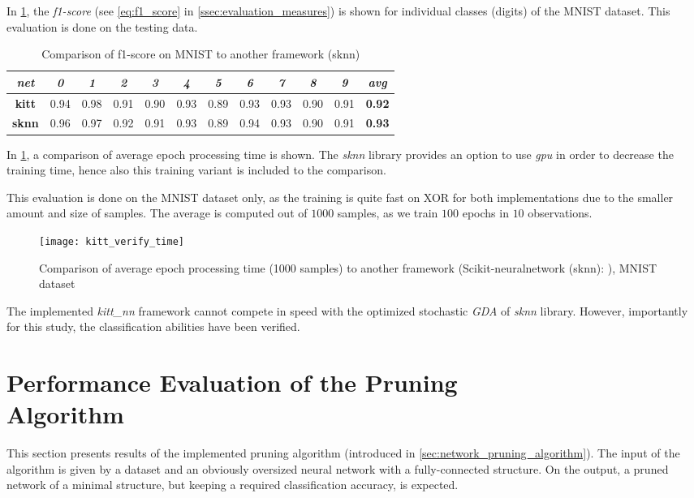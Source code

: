 In \cref{tab:kitt_verify_f1}, the \textit{f1-score} (see \cref{eq:f1_score} in \cref{ssec:evaluation_measures}) is shown for individual classes (digits) of the MNIST dataset. This evaluation is done on the testing data.

\begin{table}[H]
\centering
\caption{Comparison of f1-score on MNIST to another framework (sknn)}
\label{tab:kitt_verify_f1}
\resizebox{\textwidth}{!} {
\begin{tabular}{|c|c|c|c|c|c|c|c|c|c|c|c|}
\hline
\textit{net}  & \textit{0} & \textit{1} & \textit{2} & \textit{3} & \textit{4} & \textit{5} & \textit{6} & \textit{7} & \textit{8} & \textit{9} & \textit{avg}  \\ \hline
\textbf{kitt} & 0.94       & 0.98       & 0.91       & 0.90       & 0.93       & 0.89       & 0.93       & 0.93       & 0.90       & 0.91       & \textbf{0.92} \\ \hline
\textbf{sknn} & 0.96       & 0.97       & 0.92       & 0.91       & 0.93       & 0.89       & 0.94       & 0.93       & 0.90       & 0.91       & \textbf{0.93} \\ \hline
\end{tabular}
}
\end{table}

In \cref{fig:kitt_verify_time}, a comparison of average epoch processing time is shown. The \textit{sknn} library provides an option to use \textit{gpu} in order to decrease the training time, hence also this training variant is included to the comparison.

This evaluation is done on the MNIST dataset only, as the training is quite fast on XOR for both implementations due to the smaller amount and size of samples. The average is computed out of $ 1000 $ samples, as we train $ 100 $ epochs in $ 10 $ observations.

\begin{figure}[H]
  \centering
  \texttt{[image: kitt\_verify\_time]}
  \caption{Comparison of average epoch processing time (1000 samples) to another framework (Scikit-neuralnetwork (sknn): \citep{misc:sknn}), MNIST dataset}
  \label{fig:kitt_verify_time}
\end{figure}

The implemented \textit{kitt\_nn} framework cannot compete in speed with the optimized stochastic \textit{GDA} of \textit{sknn} library. However, importantly for this study, the classification abilities have been verified.

\section[Performance Evaluation of the Pruning Algorithm]{Performance Evaluation of the Pruning \\Algorithm} \label{sec:pruning_algorithm_results}
This section presents results of the implemented pruning algorithm (introduced in \cref{sec:network_pruning_algorithm}). The input of the algorithm is given by a dataset and an obviously oversized neural network with a fully-connected structure. On the output, a pruned network of a minimal structure, but keeping a required classification accuracy, is expected.

